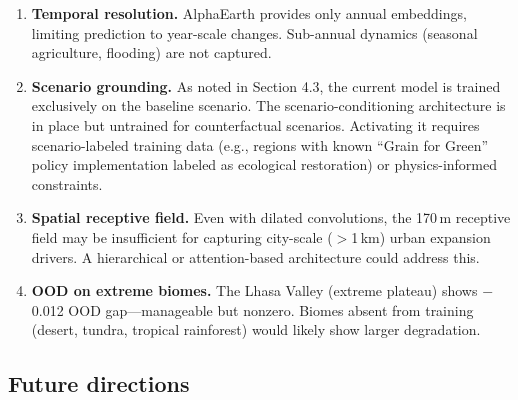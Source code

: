 \documentclass{article}
\begin{document}
\begin{enumerate}
\item \textbf{Temporal resolution.} AlphaEarth provides only annual embeddings, limiting prediction to year-scale changes. Sub-annual dynamics (seasonal agriculture, flooding) are not captured.

\item \textbf{Scenario grounding.} As noted in Section 4.3, the current model is trained exclusively on the baseline scenario. The scenario-conditioning architecture is in place but untrained for counterfactual scenarios. Activating it requires scenario-labeled training data (e.g., regions with known ``Grain for Green'' policy implementation labeled as ecological restoration) or physics-informed constraints.

\item \textbf{Spatial receptive field.} Even with dilated convolutions, the 170\,m receptive field may be insufficient for capturing city-scale ($>$1\,km) urban expansion drivers. A hierarchical or attention-based architecture could address this.

\item \textbf{OOD on extreme biomes.} The Lhasa Valley (extreme plateau) shows $-$0.012 OOD gap---manageable but nonzero. Biomes absent from training (desert, tundra, tropical rainforest) would likely show larger degradation.
\end{enumerate}

\subsection{Future directions}
\label{sec:future}
\end{document}
